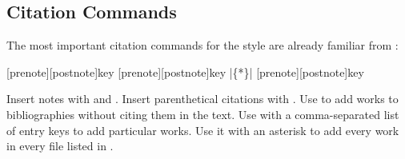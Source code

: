 \documentclass[11pt,letterpaper,oneside]{article}
\begin{document}
\subsection{Citation Commands}
\label{citecmds}

The most important citation commands for the style are already
familiar from \biblatex:

\begin{ltxsyntax}

[prenote][postnote]{key}
[prenote][postnote]{key}
|\{*\}|
[prenote][postnote]{key}

\end{ltxsyntax}

\noindent Insert notes with  and . Insert
parenthetical citations with . Use  to add
works to bibliographies without citing them in the text. Use
 with a comma-separated list of entry keys to add
particular works. Use it with an asterisk to add every work in every
 file listed in .
\end{document}
